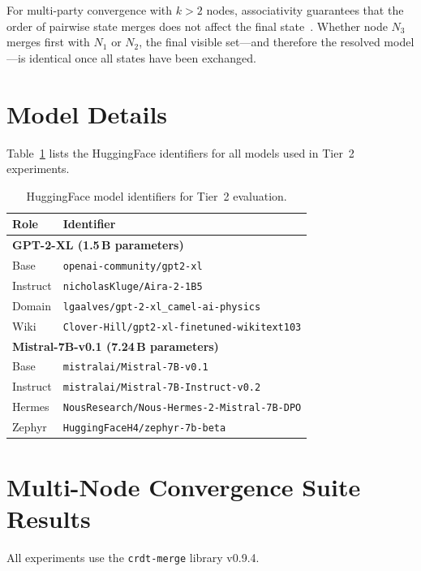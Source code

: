 \documentclass[10pt,letterpaper]{article}
\begin{document}
For multi-party convergence with $k > 2$ nodes, associativity guarantees that the order of pairwise state merges does not affect the final state~\cite{shapiro2011comprehensive}.
Whether node $N_3$ merges first with $N_1$ or $N_2$, the final visible set---and therefore the resolved model---is identical once all states have been exchanged.

\section{Model Details}\label{app:models}

Table~\ref{tab:models} lists the HuggingFace identifiers for all models used in Tier~2 experiments.

\begin{table}[t]
\centering
\caption{HuggingFace model identifiers for Tier~2 evaluation.}
\label{tab:models}
\footnotesize
\begin{tabular}{lp{}}
\toprule
Role & Identifier \\
\midrule
\multicolumn{2}{l}{\textbf{GPT-2-XL (1.5\,B parameters)}} \\
Base & \texttt{openai-community/\allowbreak gpt2-xl} \\
Instruct & \texttt{nicholasKluge/\allowbreak Aira-2-1B5} \\
Domain & \texttt{lgaalves/\allowbreak gpt-2-xl\_camel-ai-physics} \\
Wiki & \texttt{Clover-Hill/\allowbreak gpt2-xl-finetuned-wikitext103} \\
\midrule
\multicolumn{2}{l}{\textbf{Mistral-7B-v0.1 (7.24\,B parameters)}} \\
Base & \texttt{mistralai/\allowbreak Mistral-7B-v0.1} \\
Instruct & \texttt{mistralai/\allowbreak Mistral-7B-Instruct-v0.2} \\
Hermes & \texttt{NousResearch/\allowbreak Nous-Hermes-2-Mistral-7B-DPO} \\
Zephyr & \texttt{HuggingFaceH4/\allowbreak zephyr-7b-beta} \\
\bottomrule
\end{tabular}
\end{table}

\section{Multi-Node Convergence Suite Results}\label{app:convergence}

All experiments use the \texttt{crdt-merge} library v0.9.4.
\end{document}

